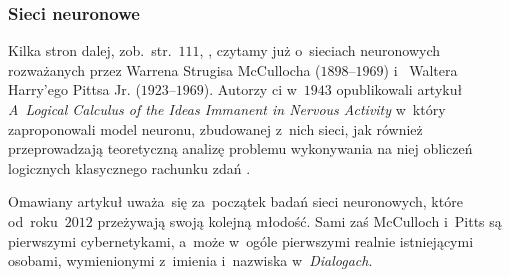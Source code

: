 \documentclass[10pt,t]{beamer}
\begin{document}
\begin{frame}
  \frametitle{Sieci neuronowe}


  Kilka stron dalej, zob.~str.~$111$,
  \parencite{Lem-Dialogi-Vol-I-Pub-1996}, czytamy już o~sieciach
  neuronowych rozważanych przez
  {Warrena Strugisa McCullocha} ($1898\text{--}1969$)
  i~
  {Waltera Harry’ego Pittsa Jr.} ($1923\text{--}1969$).
  Autorzy ci w~$1943$
  opublikowali artykuł 
  {\textit{A~Logical Calculus of the Ideas Immanent in Nervous Activity}}
  w~który zaproponowali model neuronu, zbudowanej z~nich sieci, jak również
  przeprowadzają teoretyczną analizę problemu wykonywania na niej obliczeń
  logicznych klasycznego rachunku zdań
  \parencite{Bielecki-Sztuczne-sieci-neuronowe-Slowniki-ETC-Vol-XIII-Ver-2025}.

  Omawiany artykuł uważa~się za~początek badań sieci neuronowych, które
  od~roku~$2012$ przeżywają swoją kolejną młodość. Sami zaś McCulloch
  i~Pitts są pierwszymi cybernetykami, a~może w~ogóle pierwszymi realnie
  istniejącymi osobami, wymienionymi z~imienia i~nazwiska
  w~\textit{Dialogach}.




\end{frame}
\end{document}
